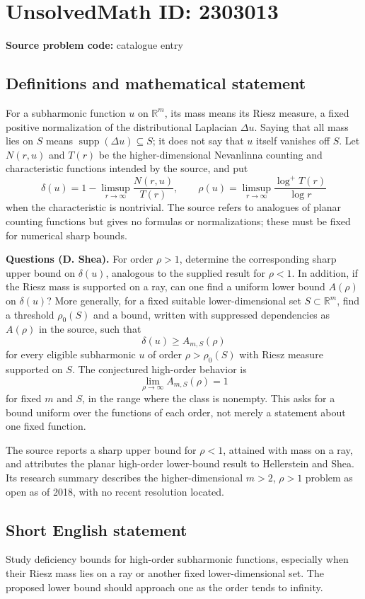 \documentclass[11pt]{article}
\begin{document}
\section*{UnsolvedMath ID: 2303013}
\textbf{Source problem code:} catalogue entry
\subsection{Definitions and mathematical statement}
For a subharmonic function $u$ on $\mathbb R^m$, its mass means its Riesz measure, a fixed positive normalization of the distributional Laplacian $\Delta u$. Saying that all mass lies on $S$ means $\operatorname{supp}(\Delta u)\subseteq S$; it does not say that $u$ itself vanishes off $S$. Let $N(r,u)$ and $T(r)$ be the higher-dimensional Nevanlinna counting and characteristic functions intended by the source, and put
\[
\delta(u)=1-\limsup_{r\to\infty}\frac{N(r,u)}{T(r)},\qquad
\rho(u)=\limsup_{r\to\infty}\frac{\log^+T(r)}{\log r}
\]
when the characteristic is nontrivial. The source refers to analogues of planar counting functions but gives no formulas or normalizations; these must be fixed for numerical sharp bounds.

\textbf{Questions (D. Shea).} For order $\rho>1$, determine the corresponding sharp upper bound on $\delta(u)$, analogous to the supplied result for $\rho<1$. In addition, if the Riesz mass is supported on a ray, can one find a uniform lower bound $A(\rho)$ on $\delta(u)$? More generally, for a fixed suitable lower-dimensional set $S\subset\mathbb R^m$, find a threshold $\rho_0(S)$ and a bound, written with suppressed dependencies as $A(\rho)$ in the source, such that
\[
\delta(u)\geq A_{m,S}(\rho)
\]
for every eligible subharmonic $u$ of order $\rho>\rho_0(S)$ with Riesz measure supported on $S$. The conjectured high-order behavior is
\[
\lim_{\rho\to\infty}A_{m,S}(\rho)=1
\]
for fixed $m$ and $S$, in the range where the class is nonempty. This asks for a bound uniform over the functions of each order, not merely a statement about one fixed function.

The source reports a sharp upper bound for $\rho<1$, attained with mass on a ray, and attributes the planar high-order lower-bound result to Hellerstein and Shea. Its research summary describes the higher-dimensional $m>2$, $\rho>1$ problem as open as of 2018, with no recent resolution located.
\subsection{Short English statement}
Study deficiency bounds for high-order subharmonic functions, especially when their Riesz mass lies on a ray or another fixed lower-dimensional set. The proposed lower bound should approach one as the order tends to infinity.
\end{document}
